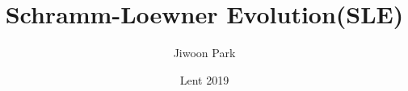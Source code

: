 \documentclass[12pt,a4paper]{article}
\DeclarePairedDelimiter\bignorm{\lVert}{\rVert}
\newcommand{\doublerule}[1][.4pt]{%
  \noindent
  \makebox[0pt][l]{\rule[.7ex]{\linewidth}{#1}}%
  \rule[.3ex]{\linewidth}{#1}}
\begin{document}
\title{Schramm-Loewner Evolution(SLE)}
\author{Jiwoon Park}
\date{Lent 2019}

\maketitle

\newcommand{\latinmodern}[1]{{\fontfamily{lmss}\selectfont
\textbf{#1}
}}

\newcommand{\thm}{\latinmodern{Theorem) }}
\newcommand{\thmnum}[1]{\latinmodern{Theorem #1) }}
\newcommand{\defi}{\latinmodern{Definition) }}
\newcommand{\definum}[1]{\latinmodern{Definition #1) }}
\newcommand{\lem}{\latinmodern{Lemma) }}
\newcommand{\lemnum}[1]{\latinmodern{Lemma #1) }}
\newcommand{\prop}{\latinmodern{Proposition) }}
\newcommand{\propnum}[1]{\latinmodern{Proposition #1) }}
\newcommand{\corr}{\latinmodern{Corollary) }}
\newcommand{\corrnum}[1]{\latinmodern{Corollary #1) }}
\newcommand{\pf}{\textbf{proof) }}
\newcommand{\fact}{\latinmodern{Fact : }}


\newcommand{\lap}{\triangle} %
\renewcommand{\s}{\vspace{10pt}}
\newcommand{\bull}{$\bullet$}
\newcommand{\sta}{$\star$}
\newcommand{\reals}{\mathbb{R}}

\newcommand{\eop}{\hfill  \textsl{(End of proof)} $\square$} %
\newcommand{\eos}{\hfill  \textsl{(End of statement)} $\square$} %

\newcommand{\charac}{\bm{1}}

\newcommand{\call}[1]{\quad \cdots\cdots\cdots\,\,(#1)}

\newcommand{\hh}{\text{\texththeng}}

\newcommand{\norms}[2]{\bignorm[\big]{#1}_{#2}}
\newcommand{\snorms}[2]{\bignorm[\small]{#1}_{#2}}
\newcommand{\abs}[1]{\big| #1 \big|}
\newcommand{\avg}{\mathbb{E}}
\newcommand{\prob}{\mathbb{P}}
\newcommand{\borel}{\mathscr{B}}
\newcommand{\EE}{\mathscr{E}}
\newcommand{\FF}{\mathscr{F}}
\newcommand{\pa}{\partial}
\renewcommand{\H}{\mathbb{H}}
\newcommand{\D}{\mathbb{D}}
\newcommand{\sle}[1]{\text{SLE}_{#1}}

\renewcommand{\vec}{\underline}
\renewcommand{\bar}{\overline}

\def\doubleunderline#1{\underline{\underline{#1}}}

\newcommand{\newday}{\doublerule[0.5pt]}
\newcommand{\digression}{**********************************************************************************************}
\end{document}
